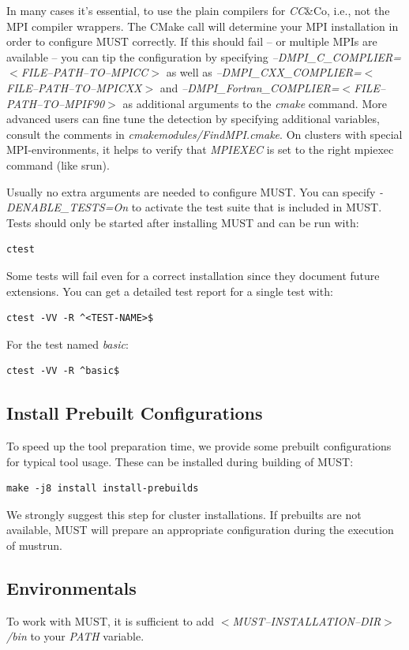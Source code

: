 \documentclass[english]{scrartcl}
\begin{document}
In many cases it's essential, to use the plain compilers for \emph{CC}\&Co, i.e., not
the MPI compiler wrappers.
The CMake call will determine your MPI installation in order to configure
MUST correctly. If this should fail -- or multiple MPIs are available -- you
can tip the configuration by specifying
\emph{\mbox{--}DMPI\_C\_COMPLIER=$<$FILE\mbox{--}PATH\mbox{--}TO\mbox{--}MPICC$>$} as well as
\emph{\mbox{--}DMPI\_CXX\_COMPLIER=$<$FILE\mbox{--}PATH\mbox{--}TO\mbox{--}MPICXX$>$} and
\emph{\mbox{--}DMPI\_Fortran\_COMPLIER=$<$FILE\mbox{--}PATH\mbox{--}TO\mbox{--}MPIF90$>$} as additional
arguments to the \emph{cmake} command. More advanced users can fine tune the
detection by specifying additional variables, consult the comments in
\emph{cmakemodules/FindMPI.cmake}. On clusters with special MPI-environments, it helps to 
verify that \emph{MPIEXEC} is set to the right mpiexec command (like srun).

Usually no extra arguments are needed to configure MUST. You can specify
\emph{-DENABLE\_TESTS=On} to activate the test suite that is included in MUST.
Tests should only be started after installing MUST and can be run with:
\begin{verbatim}
ctest
\end{verbatim}
Some tests will fail even for a correct installation since they document
future extensions. You can get a detailed test report for a single test with:
\begin{verbatim}
ctest -VV -R ^<TEST-NAME>$
\end{verbatim}
For the test named \emph{basic}:
\begin{verbatim}
ctest -VV -R ^basic$
\end{verbatim}

\subsection{Install Prebuilt Configurations}
To speed up the tool preparation time, we provide some prebuilt
configurations for typical tool usage. These can be installed during
building of MUST:
\begin{verbatim}
make -j8 install install-prebuilds
\end{verbatim}
We strongly suggest this step for cluster installations.
If prebuilts are not available, MUST will prepare an appropriate
configuration during the execution of mustrun.

\subsection{Environmentals}
To work with MUST, it is sufficient to add \emph{$<$MUST\mbox{--}INSTALLATION\mbox{--}DIR$>$/bin} 
to your \emph{PATH} variable. 
\end{document}
